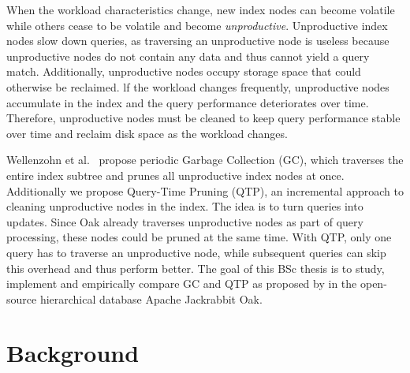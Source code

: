 \documentclass[abstracton,12pt]{scrartcl}
\theoremstyle{definition}
\begin{document}
When the workload characteristics change, new index nodes can become volatile
while others cease to be volatile and become \textit{unproductive}. Unproductive
index nodes slow down queries, as traversing an unproductive node is useless
because unproductive nodes do not contain any data 
and thus cannot yield a query match. Additionally, unproductive nodes
occupy storage space that could otherwise be reclaimed. lf the workload changes
frequently, unproductive nodes accumulate in the index and the query
performance deteriorates over time. Therefore, unproductive nodes must be
cleaned to keep query performance stable over time and reclaim disk space as
the workload changes.

Wellenzohn et al.~\cite{KW17} propose periodic Garbage Collection (GC), which
traverses the entire index subtree and prunes all unproductive index nodes at
once. Additionally we propose Query-Time Pruning (QTP), an incremental approach
to cleaning unproductive nodes in the index. The idea is to turn queries into
updates. Since Oak already traverses unproductive nodes as part of query
processing, these nodes could be pruned at the same time. 
With QTP, only one query has to traverse an unproductive node, while subsequent
queries can skip this overhead and thus perform better.
The goal of this BSc thesis is to study, implement and empirically compare GC
and QTP as proposed by \cite{KW17} in the open-source hierarchical 
database Apache Jackrabbit Oak.

\newpage\null\thispagestyle{empty}\newpage

\section{Background}



\end{document}
